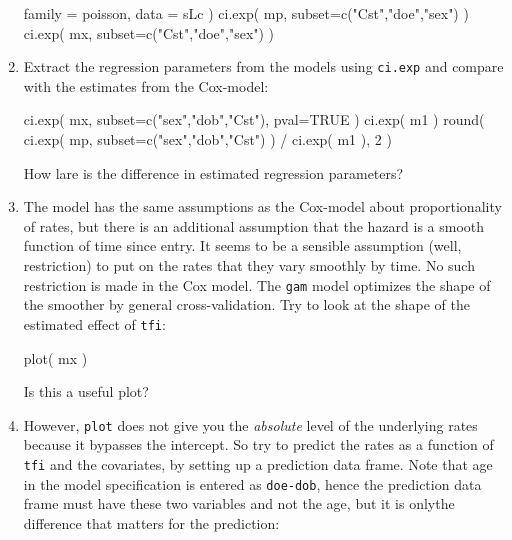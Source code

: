 \begin{enumerate}[resume]
\begin{Schunk}
\begin{Sinput}
            family = poisson, 
              data = sLc )
 ci.exp( mp, subset=c("Cst","doe","sex") )
 ci.exp( mx, subset=c("Cst","doe","sex") )
\end{Sinput}
\end{Schunk}
\item Extract the regression parameters from the models using
  \texttt{ci.exp} and compare with the estimates from the Cox-model:
\begin{Schunk}
\begin{Sinput}
 ci.exp( mx, subset=c("sex","dob","Cst"), pval=TRUE )
 ci.exp( m1 )
 round( ci.exp( mp, subset=c("sex","dob","Cst") ) / ci.exp( m1 ), 2 )
\end{Sinput}
\end{Schunk}
How lare is the difference in estimated regression parameters?
\item The model has the same assumptions as the Cox-model about
  proportionality of rates, but there is an additional assumption that
  the hazard is a smooth function of time since entry. It seems to be
  a sensible assumption (well, restriction) to put on the rates that
  they vary smoothly by time. No such restriction is made in the Cox
  model. The \texttt{gam} model optimizes the shape of the smoother by
  general cross-validation. Try to look at the shape of the
  estimated effect of \texttt{tfi}:
\begin{Schunk}
\begin{Sinput}
 plot( mx )
\end{Sinput}
\end{Schunk}
Is this a useful plot?
\item However, \texttt{plot} does not give you the \emph{absolute}
  level of the underlying rates because it bypasses the intercept. So
  try to predict the rates as a function of \texttt{tfi} and the
  covariates, by setting up a prediction data frame. Note that age
  in the model specification is entered as \texttt{doe-dob}, hence
  the prediction data frame must have these two variables and not
  the age, but it is onlythe difference that matters for the prediction:
\begin{Schunk}
\end{Schunk}
\end{enumerate}
